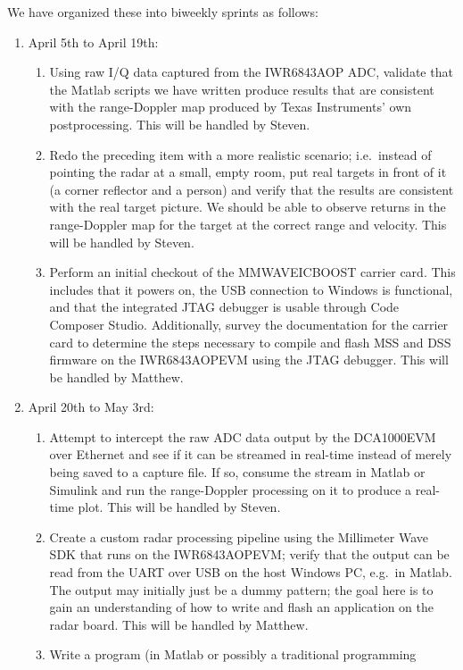 \documentclass[12pt, oneside, titlepage, final]{article}
\begin{document}
	We have organized these into biweekly sprints as follows:
	\begin{enumerate}
		\item April 5th to April 19th:
			\begin{enumerate}
				\item Using raw I/Q data captured from the IWR6843AOP ADC, validate that the
					Matlab scripts we have written produce results that are consistent
					with the range-Doppler map produced by Texas Instruments' own
					postprocessing. This will be handled by Steven.
				\item Redo the preceding item with a more realistic scenario; i.e.\ instead of
					pointing the radar at a small, empty room, put real targets in front
					of it (a corner reflector and a person) and verify that the results
					are consistent with the real target picture. We should be able to
					observe returns in the range-Doppler map for the target at the correct
					range and velocity. This will be handled by Steven.
				\item Perform an initial checkout of the MMWAVEICBOOST carrier card. This
					includes that it powers on, the USB connection to Windows is
					functional, and that the integrated JTAG debugger is usable through
					Code Composer Studio. Additionally, survey the documentation for the
					carrier card to determine the steps necessary to compile and flash MSS
					and DSS firmware on the IWR6843AOPEVM using the JTAG debugger. This
					will be handled by Matthew.
			\end{enumerate}
		\item April 20th to May 3rd:
			\begin{enumerate}
				\item Attempt to intercept the raw ADC data output by the DCA1000EVM over
					Ethernet and see if it can be streamed in real-time instead of merely
					being saved to a capture file. If so, consume the stream in Matlab or
					Simulink and run the range-Doppler processing on it to produce a
					real-time plot. This will be handled by Steven.
				\item Create a custom radar processing pipeline using the Millimeter Wave SDK
					that runs on the IWR6843AOPEVM; verify that the output can be read
					from the UART over USB on the host Windows PC, e.g.\ in Matlab. The
					output may initially just be a dummy pattern; the goal here is to gain
					an understanding of how to write and flash an application on the radar
					board. This will be handled by Matthew.
				\item Write a program (in Matlab or possibly a traditional programming

\end{enumerate}
\end{enumerate}
\end{document}
